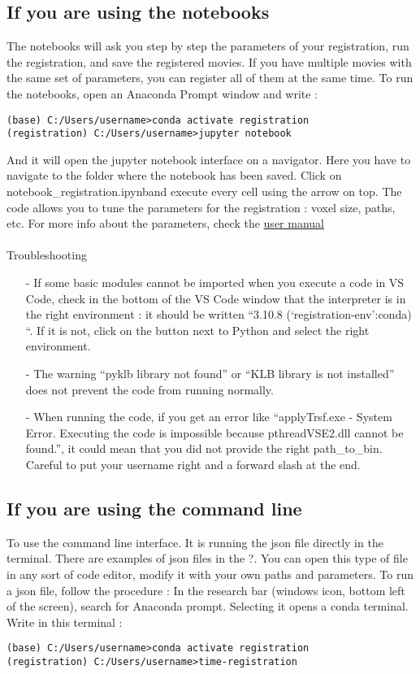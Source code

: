 \documentclass[11pt]{article}
\begin{document}
\subsection{If you are using the notebooks}
The notebooks will ask you step by step the parameters of your registration, run the registration, and save the registered movies. If you have multiple movies with the same set of parameters, you can register all of them at the same time. To run the notebooks, open an Anaconda Prompt window and write :
\begin{verbatim}
(base) C:/Users/username>conda activate registration
(registration) C:/Users/username>jupyter notebook
\end{verbatim}

And it will open the jupyter notebook interface on a navigator.
Here you have to navigate to the folder where the notebook has been saved.
Click on notebook\_registration.ipynband execute every  cell using the arrow on top.
The code allows you to tune the parameters for the registration : voxel size, paths, etc.
For more info about the parameters, check the \href{https:/github.com/GuignardLab/registration-tools/blob/master/User-manual/user-manual.pdf}{user manual}

\paragraph{}Troubleshooting
\begin{itemize}
\item[-]If some basic modules cannot be imported when you execute a code in VS Code, check in the bottom of the VS Code window that the interpreter is in the right environment : it should be written “3.10.8 (‘registration-env’:conda) “. If it is not, click on the button next to Python and select the right environment. 
\item[-]The warning “pyklb library not found” or “KLB library is not installed” does not prevent the code from running normally. 
\item[-]When running the code, if you get an error like “applyTrsf.exe - System Error. Executing the code is impossible because pthreadVSE2.dll cannot be found.”, it could mean that you did not provide the right path\_to\_bin. Careful to put your username right and a forward slash at the end.
\end{itemize}
\subsection{If you are using the command line}
To use the command line interface. It is running the json file directly in the terminal. There are examples of json files in the ?. You can open this type of file in any sort of code editor, modify it with your own paths and parameters. To run a json file, follow the procedure : In the research bar (windows icon, bottom left of the screen), search for Anaconda prompt. Selecting it opens a conda terminal. Write in this terminal :
\begin{verbatim}
(base) C:/Users/username>conda activate registration
(registration) C:/Users/username>time-registration
\end{verbatim}
\end{document}
